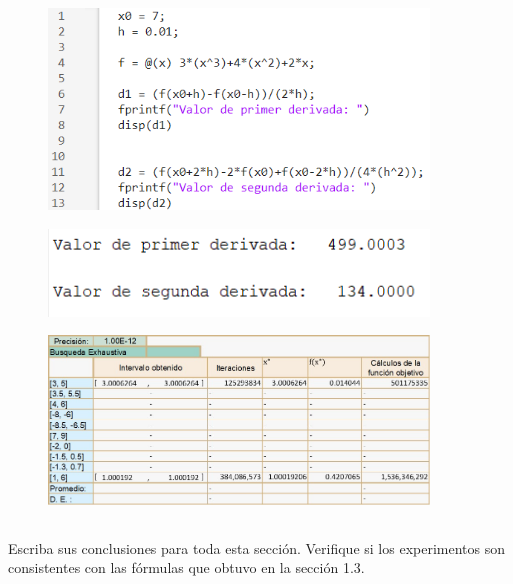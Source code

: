 \documentclass[12pt,oneside]{book}
\begin{document}
\begin{figure}[H]
    \centering
    \includegraphics[width = 0.9\textwidth]{figura3}
\end{figure}
\begin{figure}[H]
    \centering
    \includegraphics[width = 0.9\textwidth]{figura4}
\end{figure}
\begin{figure}[H]
    \centering
    \includegraphics[width = 0.9\textwidth]{figura5}
\end{figure}

\subsection[Conclusiones]{}
Escriba sus conclusiones para toda esta sección. Verifique si los experimentos
son consistentes con las fórmulas que obtuvo en la sección 1.3.
\end{document}
